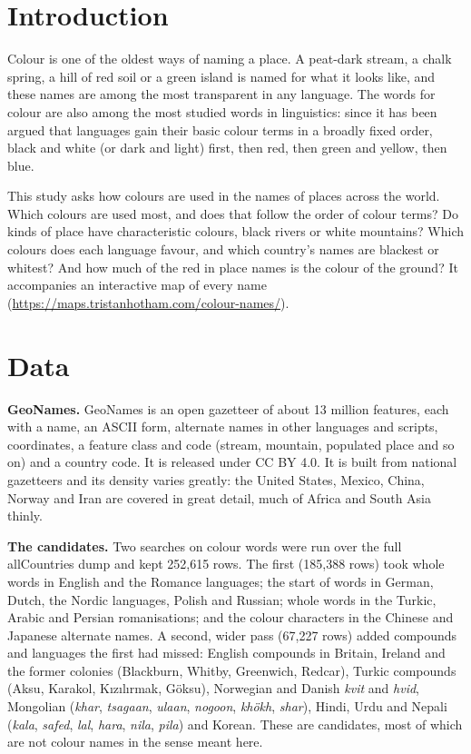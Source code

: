 \documentclass[11pt,a4paper]{article}
\begin{document}
\section{Introduction}
Colour is one of the oldest ways of naming a place. A peat-dark stream, a chalk spring, a hill of red soil or a green island is named for what it looks like, and these names are among the most transparent in any language. The words for colour are also among the most studied words in linguistics: since \citet{berlinkay} it has been argued that languages gain their basic colour terms in a broadly fixed order, black and white (or dark and light) first, then red, then green and yellow, then blue.

This study asks how colours are used in the names of places across the world. Which colours are used most, and does that follow the order of colour terms? Do kinds of place have characteristic colours, black rivers or white mountains? Which colours does each language favour, and which country's names are blackest or whitest? And how much of the red in place names is the colour of the ground? It accompanies an interactive map of every name (\url{https://maps.tristanhotham.com/colour-names/}).

\section{Data}
\textbf{GeoNames.} GeoNames \citep{geonames} is an open gazetteer of about 13 million features, each with a name, an ASCII form, alternate names in other languages and scripts, coordinates, a feature class and code (stream, mountain, populated place and so on) and a country code. It is released under CC BY 4.0. It is built from national gazetteers and its density varies greatly: the United States, Mexico, China, Norway and Iran are covered in great detail, much of Africa and South Asia thinly.

\textbf{The candidates.} Two searches on colour words were run over the full allCountries dump and kept 252,615 rows. The first (185,388 rows) took whole words in English and the Romance languages; the start of words in German, Dutch, the Nordic languages, Polish and Russian; whole words in the Turkic, Arabic and Persian romanisations; and the colour characters in the Chinese and Japanese alternate names. A second, wider pass (67,227 rows) added compounds and languages the first had missed: English compounds in Britain, Ireland and the former colonies (Blackburn, Whitby, Greenwich, Redcar), Turkic compounds (Aksu, Karakol, Kızılırmak, Göksu), Norwegian and Danish \textit{kvit} and \textit{hvid}, Mongolian (\textit{khar}, \textit{tsagaan}, \textit{ulaan}, \textit{nogoon}, \textit{khökh}, \textit{shar}), Hindi, Urdu and Nepali (\textit{kala}, \textit{safed}, \textit{lal}, \textit{hara}, \textit{nila}, \textit{pila}) and Korean. These are candidates, most of which are not colour names in the sense meant here.
\end{document}
